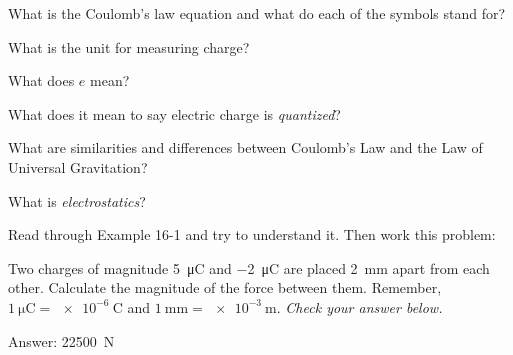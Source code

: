 \documentclass[10pt]{exam}
\begin{document}
\begin{questions}
  \question
     What is the Coulomb's law equation and what do each of the symbols stand for? \vs[2]

  \question
    What is the unit for measuring charge? \vs
  
  \question
    What does $e$ mean? \vs
  
  \question
    What does it mean to say electric charge is \emph{quantized}? \vs
  
  \question
    What are similarities and differences between Coulomb's Law and the Law of Universal Gravitation? \vs  

  \question
    What is \emph{electrostatics}? \vs

  \question
    Read through Example 16-1 and try to understand it.  Then work this problem:

    Two charges of magnitude \SI{+5}{\micro\coulomb} and \SI{-2}{\micro\coulomb} are placed \SI{2}{\milli\meter} apart from each other.  Calculate the magnitude of the force between them.  Remember, $\SI{1}{\micro\coulomb}=\SI{e-6}{\coulomb}$ and $\SI{1}{\milli\meter}=\SI{e-3}{\meter}$.  \emph{Check your answer below.} \vs[3]

    {\footnotesize Answer: \SI{22500}{\newton}}
    
\end{questions}



    

    

    
\end{document}
